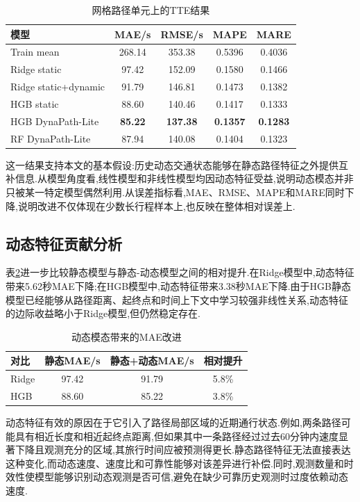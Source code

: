 \documentclass{rjthesis}
\begin{document}
\begin{table}[htbp]
	\centering
	\caption{网格路径单元上的TTE结果}
	\label{tab:main_results}
	\begin{tabular}{lcccc}
		\toprule
		模型 & MAE/s & RMSE/s & MAPE & MARE \\
		\midrule
		Train mean & 268.14 & 353.38 & 0.5396 & 0.4036 \\
		Ridge static & 97.42 & 152.09 & 0.1580 & 0.1466 \\
		Ridge static+dynamic & 91.79 & 146.81 & 0.1473 & 0.1382 \\
		HGB static & 88.60 & 140.46 & 0.1417 & 0.1333 \\
		HGB DynaPath-Lite & \textbf{85.22} & \textbf{137.38} & \textbf{0.1357} & \textbf{0.1283} \\
		RF DynaPath-Lite & 87.94 & 140.08 & 0.1404 & 0.1323 \\
		\bottomrule
	\end{tabular}
\end{table}

这一结果支持本文的基本假设:历史动态交通状态能够在静态路径特征之外提供互补信息.从模型角度看,线性模型和非线性模型均因动态特征受益,说明动态模态并非只被某一特定模型偶然利用.从误差指标看,MAE、RMSE、MAPE和MARE同时下降,说明改进不仅体现在少数长行程样本上,也反映在整体相对误差上.

\subsection{动态特征贡献分析}

表\ref{tab:gain}进一步比较静态模型与静态-动态模型之间的相对提升.在Ridge模型中,动态特征带来5.62秒MAE下降;在HGB模型中,动态特征带来3.38秒MAE下降.由于HGB静态模型已经能够从路径距离、起终点和时间上下文中学习较强非线性关系,动态特征的边际收益略小于Ridge模型,但仍然稳定存在.

\begin{table}[htbp]
	\centering
	\caption{动态模态带来的MAE改进}
	\label{tab:gain}
	\begin{tabular}{lccc}
		\toprule
		对比 & 静态MAE/s & 静态+动态MAE/s & 相对提升 \\
		\midrule
		Ridge & 97.42 & 91.79 & 5.8\% \\
		HGB & 88.60 & 85.22 & 3.8\% \\
		\bottomrule
	\end{tabular}
\end{table}

动态特征有效的原因在于它引入了路径局部区域的近期通行状态.例如,两条路径可能具有相近长度和相近起终点距离,但如果其中一条路径经过过去60分钟内速度显著下降且观测充分的区域,其旅行时间应被预测得更长.静态路径特征无法直接表达这种变化,而动态速度、速度比和可靠性能够对该差异进行补偿.同时,观测数量和时效性使模型能够识别动态观测是否可信,避免在缺少可靠历史观测时过度依赖动态速度.
\end{document}
